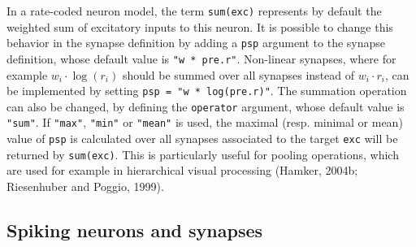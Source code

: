 \documentclass[
  11pt,
  a4paper,
]{scrbook}
\begin{document}
In a rate-coded neuron model, the term \texttt{sum(exc)} represents by
default the weighted sum of excitatory inputs to this neuron. It is
possible to change this behavior in the synapse definition by adding a
\texttt{psp} argument to the synapse definition, whose default value is
\texttt{"w\ *\ pre.r"}. Non-linear synapses, where for example
\(w_i \cdot \log(r_i)\) should be summed over all synapses instead of
\(w_i \cdot r_i\), can be implemented by setting
\texttt{psp\ =\ "w\ *\ log(pre.r)"}. The summation operation can also be
changed, by defining the \texttt{operator} argument, whose default value
is \texttt{"sum"}. If \texttt{"max"}, \texttt{"min"} or \texttt{"mean"}
is used, the maximal (resp. minimal or mean) value of \texttt{psp} is
calculated over all synapses associated to the target \texttt{exc} will
be returned by \texttt{sum(exc)}. This is particularly useful for
pooling operations, which are used for example in hierarchical visual
processing (Hamker, 2004b; Riesenhuber and Poggio, 1999).

\subsection{Spiking neurons and
synapses}\label{sec-spiking-neurons-and-synapses}
\end{document}
